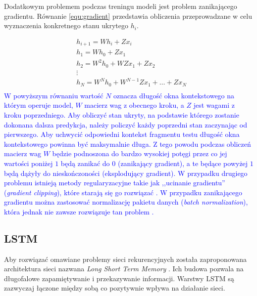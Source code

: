 \documentclass[data-science]{agh-wi} %
\begin{document}
Dodatkowym problemem podczas treningu modeli jest problem zanikającego gradientu. Równanie \ref*{equ:gradient} przedstawia obliczenia przeprowadzane w celu wyznaczenia konkretnego stanu ukrytego $h_i$.

\begin{equation} 
    \begin{aligned}
         & h_{i+1}=Wh_i+Zx_i  \\
         & h_1=Wh_0+Zx_1  \\
         & h_2=W^2h_0+WZx_1+Zx_2 \\
         & \vdots \\
         & h_N = W^Nh_0+W^{N-1}Zx_1 +\dots + Zx_N\\
    \end{aligned}
    \label{equ:gradient}
\end{equation}
\textcolor{blue}{W powyższym równaniu wartość $N$ oznacza długość okna kontekstowego na którym operuje model, $W$ macierz wag z obecnego kroku, a $Z$ jest wagami z kroku poprzedniego. Aby obliczyć stan ukryty, na podstawie którego zostanie dokonana dalsza predykcja, należy policzyć każdy poprzedni stan zaczynając od pierwszego. Aby uchwycić odpowiedni kontekst fragmentu testu długość okna kontekstowego powinna być maksymalnie długa. Z tego powodu podczas obliczeń macierz wag $W$ będzie podnoszona do bardzo wysokiej potęgi przez co jej wartości poniżej $1$ będą zanikać do $0$ (zanikający gradient), a te będące powyżej $1$ będą dążyły do nieskończoności (eksplodujący gradient). W przypadku drugiego problemu istnieją metody regularyzacyjne takie jak ,,ucinanie gradientu'' (\textit{gradient clipping}), które starają się go rozwiązać \cite*{deeplearning_book}. W przypadku zanikającego gradientu można zastosować normalizację pakietu danych (\textit{batch normalization}), która jednak nie zawsze rozwiązuje tan problem \cite*{batch_norm}.}

\subsection{LSTM}
Aby rozwiązać omawiane problemy sieci rekurencyjnych została zaproponowana architektura sieci nazwana \textit{Long Short Term Memory} \cite{lstm_og}. Ich budowa pozwala na długofalowe zapamiętywanie i przekazywanie informacji. Warstwy LSTM są zazwyczaj łączone między sobą co pozytywnie wpływa na działanie sieci.
\end{document}
